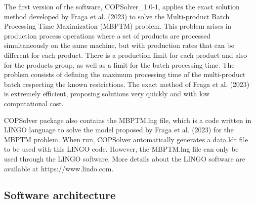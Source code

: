 \documentclass[11pt, letterpaper]{article}
\begin{document}
The first version of the software, COPSolver\_1.0-1, applies the exact solution method developed by Fraga et al. (2023) to solve the Multi-product Batch Processing Time Maximization (MBPTM) problem. This problem arises in production process operations where a set of products are processed simultaneously on the same machine, but with production rates that can be different for each product. There is a production limit for each product and also for the products group, as well as a limit for the batch processing time. The problem consists of defining the maximum processing time of the multi-product batch respecting the known restrictions. The exact method of Fraga et al. (2023) is extremely efficient, proposing solutions very quickly and with low computational cost. 

COPSolver package also contains the MBPTM.lng file, which is a code written in LINGO language to solve the model proposed by Fraga et al. (2023) for the MBPTM problem. When run, COPSolver automatically generates a data.ldt file to be used with this LINGO code. However, the MBPTM.lng file can only be used through the LINGO software. More details about the LINGO software are available at https://www.lindo.com.

\subsection{Software architecture}
\end{document}
